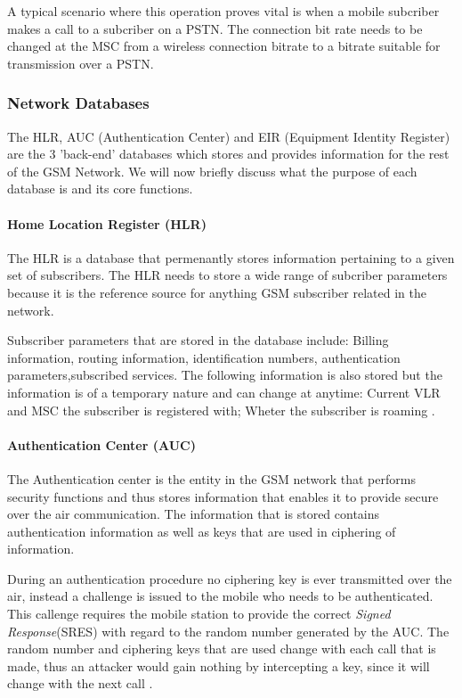 A typical scenario where this operation proves vital is when a mobile subcriber makes a call to a subcriber on a PSTN. The connection bit rate needs to be changed at the MSC from a wireless connection bitrate to a bitrate suitable for transmission over a PSTN.

\subsubsection{Network Databases}
The HLR, AUC (Authentication Center) and EIR (Equipment Identity Register) are the 3 'back-end' databases which stores and provides information for the rest of the GSM Network. We will now briefly discuss what the purpose of each database is and its core functions.

\paragraph{Home Location Register (HLR)}
The HLR is a database that permenantly stores information pertaining to a given set of subscribers. The HLR needs to store a wide range of subcriber parameters because it is the reference source for anything GSM subscriber related in the network. 

Subscriber parameters that are stored in the database include: Billing information, routing information, identification numbers, authentication parameters,subscribed services. The following information is also stored but the information is of a temporary nature and can change at anytime: Current VLR and MSC the subscriber is registered with; Wheter the subscriber is roaming \cite{GSMSysEngin}.

\paragraph{Authentication Center (AUC)}
The Authentication center is the entity in the GSM network that performs security functions and thus stores information that enables it to provide secure over the air communication. The information that is stored contains authentication information as well as keys that are used in ciphering of information.

During an authentication procedure no ciphering key is ever transmitted over the air, instead a challenge is issued to the mobile who needs to be authenticated. This callenge requires the mobile station to provide the correct \emph{Signed Response}(SRES) with regard to the random number generated by the AUC. The random number and ciphering keys that are used change with each call that is made, thus an attacker would gain nothing by intercepting a key, since it will change with the next call \cite{GSMSysEngin}.

